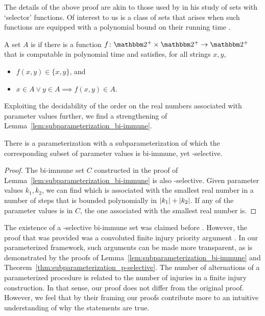 The details of the above proof are akin to those used by \textcite{jockusch1968semirecursive} in his study of sets with `selector' functions.
Of interest to us is a class of sets that arises when such functions are equipped with a polynomial bound on their running time  \parencite{selman1979p-selective}.
\begin{definition}
  A set $A$ is  if there is a function $f\colon \binary^+ \times \binary^+ \to \binary^+$ that is computable in polynomial time and satisfies, for all strings $x, y$,
  \begin{itemize}
  \item $f(x, y) \in \{x, y\}$, and
  \item $x \in A \lor y \in A \implies f(x, y) \in A$.
  \end{itemize}
\end{definition}

Exploiting the decidability of the order on the real numbers associated with parameter values further, we find a strengthening of Lemma~\ref{lem:subparameterization_bi-immune}.
\begin{theorem}
\label{thm:subparameterization_p-selective}
  There is a parameterization with a subparameterization of which the corresponding subset of parameter values is bi-immune, yet \slp-selective.
\end{theorem}
\begin{proof}
  The bi-immune set $C$ constructed in the proof of Lemma~\ref{lem:subparameterization_bi-immune} is also \slp-selective.
  Given parameter values $k_1, k_2$, we can find which is associated with the smallest real number in a number of steps that is bounded polynomially in ${\lvert k_1\rvert} + {\lvert k_2\rvert}$.
  If any of the parameter values is in $C$, the one associated with the smallest real number is.
\end{proof}

The existence of a \slp-selective bi-immune set was claimed before \parencite{goldsmith1993note}.
However, the proof that was provided was a convoluted finite injury priority argument \parencite[see also][]{downey2010algorithmic}.
In our parameterized framework, such arguments can be made more transparent, as is demonstrated by the proofs of Lemma~\ref{lem:subparameterization_bi-immune} and Theorem~\ref{thm:subparameterization_p-selective}.
The number of alternations of a parameterized procedure is related to the number of injuries in a finite injury construction.
In that sense, our proof does not differ from the original proof.
However, we feel that by their framing our proofs contribute more to an intuitive understanding of why the statements are true.
